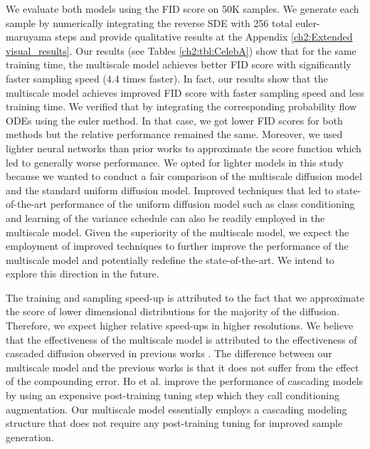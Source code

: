 We evaluate both models using the FID score on 50K samples. We generate each sample by numerically integrating the reverse SDE with 256 total euler-maruyama steps and provide qualitative results at the Appendix \ref{ch2:Extended visual_results}. Our results (see Tables  \ref{ch2:tbl:CelebA}) show that for the same training time, the multiscale model achieves better FID score with significantly faster sampling speed ($4.4$ times faster). In fact, our results show that the multiscale model achieves improved FID score with faster sampling speed and less training time. We verified that by integrating the corresponding probability flow ODEs using the euler method. In that case, we got lower FID scores for both methods but the relative performance remained the same. Moreover, we used lighter neural networks than prior works to approximate the score function which led to generally worse performance. We opted for lighter models in this study because we wanted to conduct a fair comparison of the multiscale diffusion model and the standard uniform diffusion model. Improved techniques that led to state-of-the-art performance of the uniform diffusion model such as class conditioning and learning of the variance schedule \cite{dhariwal2021diffusion_beats_gans} can also be readily employed in the multiscale model. Given the superiority of the multiscale model, we expect the employment of improved techniques to further improve the performance of the multiscale model and potentially redefine the state-of-the-art. We intend to explore this direction in the future.

The training and sampling speed-up is attributed to the fact that we approximate the score of lower dimensional distributions for the majority of the diffusion. Therefore, we expect higher relative speed-ups in higher resolutions. We believe that the effectiveness of the multiscale model is attributed to the effectiveness of cascaded diffusion observed in previous works \cite{saharia2021sr3, dhariwal2021diffusion_beats_gans}. The difference between our multiscale model and the previous works is that it does not suffer from the effect of the compounding error. Ho et al. \cite{saharia2021sr3} improve the performance of cascading models by using an expensive post-training tuning step which they call conditioning augmentation. Our multiscale model essentially employs a cascading modeling structure that does not require any post-training tuning for improved sample generation.



